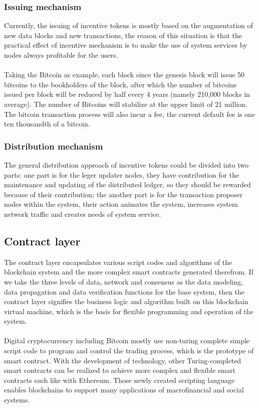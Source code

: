\documentclass[]{article}
\begin{document}
\begin{CJK*}{UTF8}{gbsn}
\subsubsection*{Issuing mechanism}
Currently, the issuing of incentive tokens is mostly based on the augmentation of new data blocks and new transactions, the reason of this situation is that the  practical effect of incentive mechanism is to make the use of system services by nodes always profitable for the users.
\paragraph{} Taking the Bitcoin as example, each block since the genesis block will issue 50 bitcoins to the bookholders of the block, after which the number of bitcoins issued per block will be reduced by half every 4 years (namely 210,000 blocks in average). The number of Bitcoins will stabilize at the upper limit of 21 million. The bitcoin transaction process will also incur a fee, the current default fee is one ten thousandth of a bitcoin.
\subsubsection*{Distribution mechanism}
The general distribution approach of incentive tokens could be divided into two parts: one part is for the leger updater nodes, they have contribution for the maintenance and updating of the distributed ledger, so they should be rewarded because of their contribution; the another part is for the transaction proposer nodes within the system, their action animates the system, increases system network traffic and creates needs of system service. 
\subsection{Contract layer}
The contract layer encapsulates various script codes and algorithms of the blockchain system and the more complex smart contracts generated therefrom. If we take the three levels of data, network and consensus as the data modeling, data propagation and data verification functions for the base system, then the contract layer signifies the business logic and algorithm built on this blockchain virtual machine, which is the basis for flexible programming and operation of the system. 
\paragraph{} Digital cryptocurrency including Bitcoin mostly use non-turing complete simple script code to program and control the trading process, which is the prototype of smart contract. With the development of technology, other Turing-completed smart contracts can be realized to achieve more complex and flexible smart contracts such like with Ethereum. Those newly created scripting language enables blockchains to support many applications of macrofinancial and social systems.

\end{CJK*}
\end{document}
